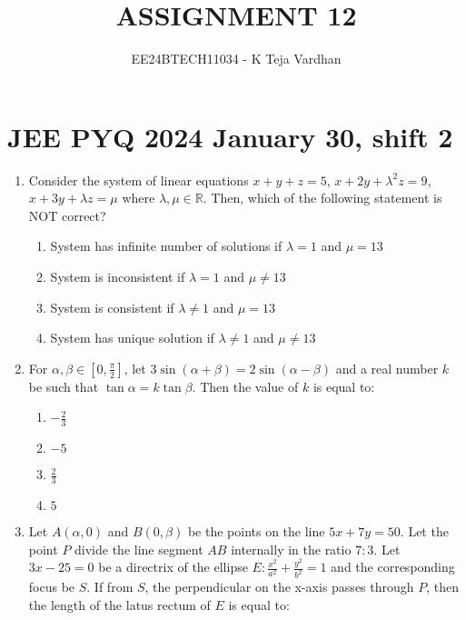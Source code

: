 \documentclass[journal]{IEEEtran}
\newcommand{\brak}[1]{\left( #1 \right)}
\newcommand{\sbrak}[1]{\left[ #1 \right]}
\begin{document}

\title{ASSIGNMENT 12}
\author{EE24BTECH11034 - K Teja Vardhan}
{\let\newpage\relax\maketitle}

\section{JEE PYQ 2024 January 30, shift 2}
\begin{enumerate}

    \item Consider the system of linear equations
    $x + y + z = 5$, $x + 2y + \lambda^{2}z = 9$,
    $x + 3y + \lambda z = \mu$ where $\lambda, \mu \in \mathbb{R}$. Then, which of
    the following statement is NOT correct?
        
        \begin{enumerate}
        \item System has infinite number of solutions if $\lambda = 1$
        and $\mu = 13$
        \item System is inconsistent if $\lambda = 1$ and $\mu \ne 13$
        \item System is consistent if $\lambda \ne 1$ and $\mu = 13$
        \item System has unique solution if $\lambda \ne 1$ and $\mu \ne 13$
        \end{enumerate}

    \item For $\alpha,\beta\in\sbrak{0,\frac{\pi}{2}}$, let $3\sin\brak{\alpha+\beta}=2\sin\brak{\alpha-\beta}$ and a real number $k$ be such that $\tan\alpha=k\tan\beta$. Then the value of $k$ is equal to:

        \begin{multicols}{4}
        \begin{enumerate}
        \item $-\frac{2}{3}$
        \item $-5$
        \item $\frac{2}{3}$
        \item $5$
        \end{enumerate}
        \end{multicols}

    \item Let $A\brak{\alpha,0}$ and $B\brak{0,\beta}$ be the points on the line $5x+7y=50$. Let the point $P$ divide the line segment $AB$ internally in the ratio $7:3$. Let $3x-25=0$ be a directrix of the ellipse $E:\frac{x^{2}}{a^{2}}+\frac{y^{2}}{b^{2}}=1$ and the corresponding focus be $S$. If from $S$, the perpendicular on the x-axis passes through $P$, then the length of the latus rectum of $E$ is equal to:


\end{enumerate}
\end{document}
